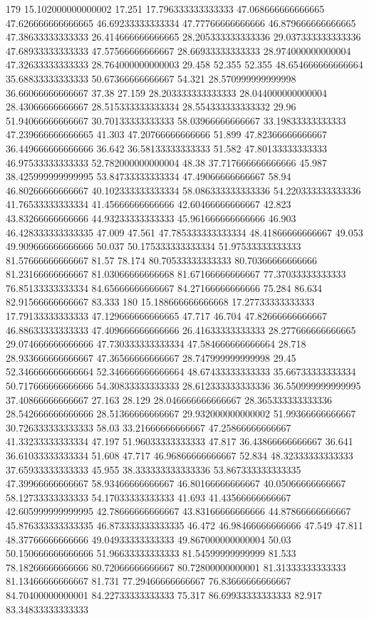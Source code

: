 179 15.102000000000002 17.251 17.796333333333333 47.068666666666665 47.626666666666665 46.69233333333334 47.77766666666666 46.879666666666665 47.38633333333333 26.414666666666665 28.205333333333336 29.037333333333336 47.68933333333333 47.57566666666667 28.66933333333333 28.974000000000004 47.32633333333333 28.764000000000003 29.458 52.355 52.355 48.654666666666664 35.68833333333333 50.67366666666667 54.321 28.570999999999998 36.66066666666667 37.38 27.159 28.203333333333333 28.044000000000004 28.43066666666667 28.515333333333334 28.554333333333332 29.96 51.94066666666667 30.70133333333333 58.03966666666667 33.19833333333333 47.239666666666665 41.303 47.20766666666666 51.899 47.82366666666667 36.449666666666666 36.642 36.58133333333333 51.582 47.80133333333333 46.97533333333333 52.782000000000004 48.38 37.717666666666666 45.987 38.425999999999995 53.84733333333334 47.49066666666667 58.94 46.80266666666667 40.102333333333334 58.086333333333336 54.220333333333336 41.76533333333334 41.45666666666666 42.60466666666667 42.823 43.83266666666666 44.93233333333333 45.961666666666666 46.903 46.428333333333335 47.009 47.561 47.785333333333334 48.41866666666667 49.053 49.909666666666666 50.037 50.175333333333334 51.97533333333333 81.57666666666667 81.57 78.174 80.70533333333333 80.70366666666666 81.23166666666667 81.03066666666668 81.67166666666667 77.37033333333333 76.85133333333334 84.65666666666667 84.27166666666666 75.284 86.634 82.91566666666667 83.333
180 15.188666666666668 17.27733333333333 17.79133333333333 47.129666666666665 47.717 46.704 47.82666666666667 46.88633333333333 47.409666666666666 26.41633333333333 28.277666666666665 29.074666666666666 47.730333333333334 47.584666666666664 28.718 28.933666666666667 47.36566666666667 28.747999999999998 29.45 52.346666666666664 52.346666666666664 48.67433333333333 35.66733333333334 50.717666666666666 54.30833333333333 28.612333333333336 36.550999999999995 37.40866666666667 27.163 28.129 28.046666666666667 28.365333333333336 28.542666666666666 28.51366666666667 29.932000000000002 51.99366666666667 30.726333333333333 58.03 33.21666666666667 47.25866666666667 41.33233333333334 47.197 51.96033333333333 47.817 36.43866666666667 36.641 36.61033333333334 51.608 47.717 46.96866666666667 52.834 48.32333333333333 37.65933333333333 45.955 38.333333333333336 53.867333333333335 47.39966666666667 58.93466666666667 46.80166666666667 40.05066666666667 58.12733333333333 54.17033333333333 41.693 41.43566666666667 42.605999999999995 42.78666666666667 43.83166666666666 44.87866666666667 45.876333333333335 46.873333333333335 46.472 46.98466666666666 47.549 47.811 48.37766666666666 49.04933333333333 49.867000000000004 50.03 50.150666666666666 51.96633333333333 81.54599999999999 81.533 78.18266666666666 80.72066666666667 80.72800000000001 81.31333333333333 81.13466666666667 81.731 77.29466666666667 76.83666666666667 84.70400000000001 84.22733333333333 75.317 86.69933333333333 82.917 83.34833333333333
